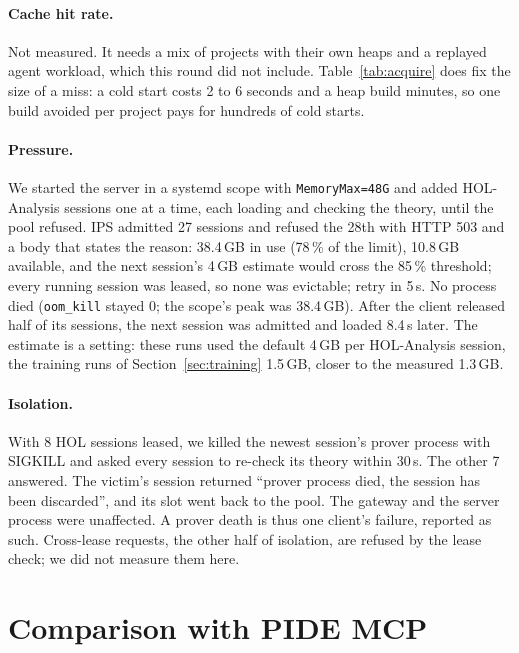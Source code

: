 \documentclass[11pt]{article}
\newcommand{\code}[1]{\colorbox{gray!12}{\texttt{\vphantom{Ag}#1}}}
\begin{document}
\paragraph{Cache hit rate.} Not measured. It needs a mix of projects with
their own heaps and a replayed agent workload, which this round did not
include. Table~\ref{tab:acquire} does fix the size of a miss: a cold
start costs 2 to 6 seconds and a heap build minutes, so one build avoided
per project pays for hundreds of cold starts.

\paragraph{Pressure.} We started the server in a systemd scope with
\code{MemoryMax=48G} and added HOL-Analysis sessions one at a time, each
loading and checking the theory, until the pool refused. IPS admitted 27
sessions and refused the 28th with HTTP 503 and a body that states the
reason: 38.4\,GB in use (78\,\% of the limit), 10.8\,GB available, and
the next session's 4\,GB estimate would cross the 85\,\% threshold; every
running session was leased, so none was evictable; retry in 5\,s. No
process died (\code{oom\_kill} stayed 0; the scope's peak was 38.4\,GB).
After the client released half of its sessions, the next session was
admitted and loaded 8.4\,s later. The estimate is a setting: these runs
used the default 4\,GB per HOL-Analysis session, the training runs of
Section~\ref{sec:training} 1.5\,GB, closer to the measured 1.3\,GB.

\paragraph{Isolation.} With 8 HOL sessions leased, we killed the newest
session's prover process with SIGKILL and asked every session to re-check
its theory within 30\,s. The other 7 answered. The victim's session
returned ``prover process died, the session has been discarded'', and
its slot went back to the pool. The gateway and the server process were
unaffected. A prover death is thus one client's failure, reported as
such. Cross-lease requests, the other half of isolation, are refused by
the lease check; we did not measure them here.

\section{Comparison with PIDE MCP}
\label{sec:comparison}
\end{document}
